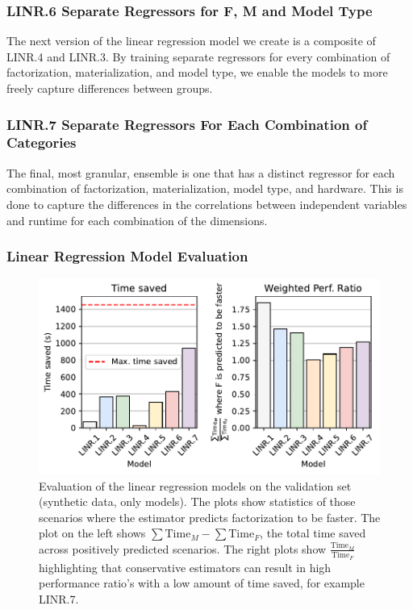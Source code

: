 \subsubsection*{LINR.6 Separate Regressors for F, M and Model Type}
The next version of the linear regression model we create is a composite of LINR.4 and LINR.3. By training separate regressors for every combination of factorization, materialization, and model type, we enable the models to more freely capture differences between groups.

\subsubsection*{LINR.7 Separate Regressors For Each Combination of Categories}
The final, most granular, ensemble is one that has a distinct regressor for each combination of factorization, materialization, model type, and hardware. This is done to capture the differences in the correlations between independent variables and runtime for each combination of the dimensions.


\subsubsection{Linear Regression Model Evaluation}
\begin{figure}[ht]
    \centering
    \includegraphics[width=0.75\linewidth]{chapters/05_cost_estimation/figures/stat-models-compare.pdf}
    \caption[Linear Regression Model Evaluation]{Evaluation of the linear regression models on the validation set (synthetic data, only models). The plots show statistics of those scenarios where the estimator predicts factorization to be faster. The plot on the left shows $\sum \text{Time}_M - \sum \text{Time}_F$, the total time saved across positively predicted scenarios. The right plots show $\frac{\text{Time}_M}{\text{Time}_F}$ highlighting that conservative estimators can result in high performance ratio's with a low amount of time saved, for example LINR.7.}
    \label{fig:5-linear-regression-model-evaluation}
\end{figure}

